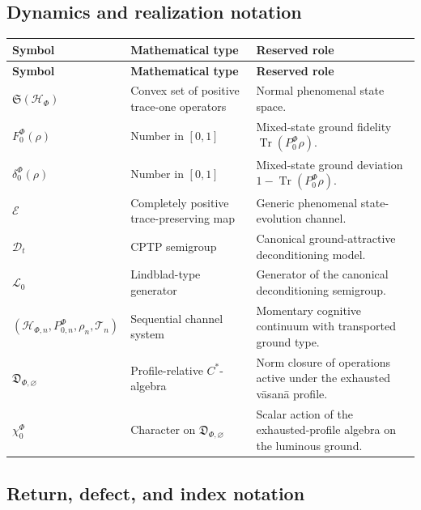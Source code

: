 \documentclass[11pt,reqno]{scrartcl}
\newcommand{\scrHF}{\mathscr H_{\Phi}}
\newcommand{\PzeroF}{P_{0}^{\Phi}}
\DeclareMathOperator{\Tr}{Tr}
\newcommand{\detAlgEmpty}{\mathfrak D_{\Phi,\varnothing}}
\theoremstyle{plain}
\theoremstyle{definition}
\theoremstyle{remark}
\begin{document}
\subsection{Dynamics and realization notation}

\begin{longtable}{>{\raggedright\arraybackslash}p{}
>{\raggedright\arraybackslash}p{}
>{\raggedright\arraybackslash}p{}}
\toprule
\textbf{Symbol} & \textbf{Mathematical type} & \textbf{Reserved role} \\
\midrule
\endfirsthead
\toprule
\textbf{Symbol} & \textbf{Mathematical type} & \textbf{Reserved role} \\
\midrule
\endhead
$\mathfrak S(\scrHF)$ & Convex set of positive trace-one operators & Normal phenomenal state space. \\
$F_0^{\Phi}(\rho)$ & Number in $[0,1]$ & Mixed-state ground fidelity $\Tr(\PzeroF\rho)$. \\
$\delta_0^{\Phi}(\rho)$ & Number in $[0,1]$ & Mixed-state ground deviation $1-\Tr(\PzeroF\rho)$. \\
$\mathcal E$ & Completely positive trace-preserving map & Generic phenomenal state-evolution channel. \\
$\mathcal D_t$ & CPTP semigroup & Canonical ground-attractive deconditioning model. \\
$\mathcal L_0$ & Lindblad-type generator & Generator of the canonical deconditioning semigroup. \\
$(\mathscr H_{\Phi,n},P_{0,n}^{\Phi},\rho_n,\mathcal T_n)$ & Sequential channel system & Momentary cognitive continuum with transported ground type. \\
$\detAlgEmpty$ & Profile-relative $C^*$-algebra & Norm closure of operations active under the exhausted v\=asan\=a profile. \\
$\chi_0^{\Phi}$ & Character on $\detAlgEmpty$ & Scalar action of the exhausted-profile algebra on the luminous ground. \\
\bottomrule
\end{longtable}

\subsection{Return, defect, and index notation}
\end{document}
